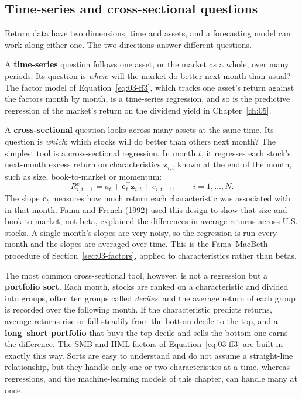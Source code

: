 \subsection{Time-series and cross-sectional questions}
\label{sec:21-crosssection}

Return data have two dimensions, time and assets, and a forecasting model can work along either one. The two directions answer different questions.

A \textbf{time-series} question follows one asset, or the market as a whole, over many periods. Its question is \emph{when}: will the market do better next month than usual? The factor model of Equation~\eqref{eq:03-ff3}, which tracks one asset's return against the factors month by month, is a time-series regression, and so is the predictive regression of the market's return on the dividend yield in Chapter~\ref{ch:05}.

A \textbf{cross-sectional} question looks across many assets at the same time. Its question is \emph{which}: which stocks will do better than others next month? The simplest tool is a cross-sectional regression. In month $t$, it regresses each stock's next-month excess return on characteristics $\mathbf{z}_{i,t}$ known at the end of the month, such as size, book-to-market or momentum:
\begin{equation}
  R^{e}_{i,t+1} = a_t + \mathbf{c}_t^{\top} \mathbf{z}_{i,t} + e_{i,t+1}, \qquad i = 1, \dots, N.
  \label{eq:21-xs}
\end{equation}
The slope $\mathbf{c}_t$ measures how much return each characteristic was associated with in that month. Fama and French (1992) used this design to show that size and book-to-market, not beta, explained the differences in average returns across U.S. stocks. A single month's slopes are very noisy, so the regression is run every month and the slopes are averaged over time. This is the Fama--MacBeth procedure of Section~\ref{sec:03-factors}, applied to characteristics rather than betas.

The most common cross-sectional tool, however, is not a regression but a \textbf{portfolio sort}. Each month, stocks are ranked on a characteristic and divided into groups, often ten groups called \emph{deciles}, and the average return of each group is recorded over the following month. If the characteristic predicts returns, average returns rise or fall steadily from the bottom decile to the top, and a \textbf{long--short portfolio} that buys the top decile and sells the bottom one earns the difference. The SMB and HML factors of Equation~\eqref{eq:03-ff3} are built in exactly this way. Sorts are easy to understand and do not assume a straight-line relationship, but they handle only one or two characteristics at a time, whereas regressions, and the machine-learning models of this chapter, can handle many at once.

